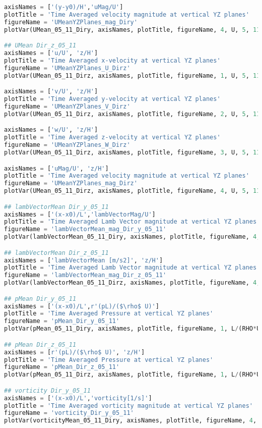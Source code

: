 \documentclass[../main.tex]{subfiles}
\begin{document}
\begin{lstlisting}[language=python]
axisNames = ['(y-y0)/H','uMag/U']
plotTitle = 'Time Averaged velocity magnitude at vertical YZ planes'
figureName = 'UMeanYZPlanes_mag_Diry'
plotVar(UMean_05_11_Diry, axisNames, plotTitle, figureName, 4, U, 5, 11)

## UMean Dir_z_05_11
axisNames = ['u/U', 'z/H']
plotTitle = 'Time Averaged x-velocity at vertical YZ planes'
figureName = 'UMeanYZPlanes_U_Dirz'
plotVar(UMean_05_11_Dirz, axisNames, plotTitle, figureName, 1, U, 5, 11)

axisNames = ['v/U', 'z/H']
plotTitle = 'Time Averaged y-velocity at vertical YZ planes'
figureName = 'UMeanYZPlanes_V_Dirz'
plotVar(UMean_05_11_Dirz, axisNames, plotTitle, figureName, 2, U, 5, 11)

axisNames = ['w/U', 'z/H']
plotTitle = 'Time Averaged z-velocity at vertical YZ planes'
figureName = 'UMeanYZPlanes_W_Dirz'
plotVar(UMean_05_11_Dirz, axisNames, plotTitle, figureName, 3, U, 5, 11)

axisNames = ['uMag/U', 'z/H']
plotTitle = 'Time Averaged velocity magnitude at vertical YZ planes'
figureName = 'UMeanYZPlanes_mag_Dirz'
plotVar(UMean_05_11_Dirz, axisNames, plotTitle, figureName, 4, U, 5, 11)

## lambVectorMean Dir_y_05_11
axisNames = ['(x-x0)/L','lambVectorMag/U']
plotTitle = 'Time Averaged Lamb Vector magnitude at vertical YZ planes'
figureName = 'lambVectorMean_mag_Dir_y_05_11'
plotVar(lambVectorMean_05_11_Diry, axisNames, plotTitle, figureName, 4, 1, 5, 11)

## lambVectorMean Dir_z_05_11
axisNames = ['lambVectorMean [m/s2]', 'z/H']
plotTitle = 'Time Averaged Lamb Vector magnitude at vertical YZ planes'
figureName = 'lambVectorMean_mag_Dir_z_05_11'
plotVar(lambVectorMean_05_11_Dirz, axisNames, plotTitle, figureName, 4, 1, 5, 11)

## pMean Dir_y_05_11
axisNames = ['(x-x0)/L',r'(pL)/($\rho$ U)']
plotTitle = 'Time Averaged Pressure at vertical YZ planes'
figureName = 'pMean_Dir_y_05_11'
plotVar(pMean_05_11_Diry, axisNames, plotTitle, figureName, 1, L/(RHO*U), 5, 11)

## pMean Dir_z_05_11
axisNames = [r'(pL)/($\rho$ U)', 'z/H']
plotTitle = 'Time Averaged Pressure at vertical YZ planes'
figureName = 'pMean_Dir_z_05_11'
plotVar(pMean_05_11_Dirz, axisNames, plotTitle, figureName, 1, L/(RHO*U), 5, 11)

## vorticity Dir_y_05_11
axisNames = ['(x-x0)/L','vorticity[1/s]']
plotTitle = 'Time Averaged vorticity magnitude at vertical YZ planes'
figureName = 'vorticity_Dir_y_05_11'
plotVar(vorticityMean_05_11_Diry, axisNames, plotTitle, figureName, 4, 1, 5, 11)


\end{lstlisting}
\end{document}
